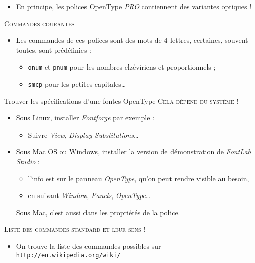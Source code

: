 \documentclass[12pt,a4paper,twocolumn]{book} %
\def\ogla{{\fontfamily{fi4}\selectfont<<}}
\def\fgla{{\fontfamily{fi4}\selectfont>>}}
\begin{document}
{\begin{itemize}
	
			
				
				Regardez attentivement petites capitales penchées et les \ogla s \fgla !
				
				Il faut, bien sûr, que la fonte considérée le permette !
				\item<+->  En principe, les polices OpenType \textit{PRO} contiennent des variantes optiques !
\end{itemize}
{\textsc{Commandes courantes}}
			
			\begin{itemize}
				\item<+-> Les commandes de ces polices sont des mots de 4 lettres, certaines, souvent toutes, sont prédéfinies :
				\begin{itemize}
					\item<+-> \texttt{onum} et \texttt{pnum} pour les nombres elzéviriens et proportionnels ;
					\item<+-> \texttt{smcp} pour les petites capitales\dots
				\end{itemize}
			\end{itemize}		
		
		
	{Trouver les spécifications d'une fontes OpenType}	
{\textsc{Cela dépend du système !}}
  \begin{itemize}
  \item Sous Linux, installer \textit{Fontforge} par exemple :
			\begin{itemize}
				\item<+-> Suivre \textit{View}, \textit{Display Substitutions}\dots
			\end{itemize}
	\item Sous Mac OS ou Windows, installer la version de démonstration de \textit{FontLab Studio} :
			\begin{itemize}
				\item<+-> l'info est sur le panneau \textit{OpenType}, qu'on peut rendre visible au besoin,
				\item<+-> en suivant \textit{Window}, \textit{Panels}, \textit{OpenType}\dots
			\end{itemize}
			Sous Mac, c'est aussi dans les propriétés de la police.
	\end{itemize}		
		
		
		{\textsc{Liste des commandes standard et leur sens !}}
			
			\begin{itemize}
				\item<+-> On trouve la liste des commandes possibles sur \verb=http://en.wikipedia.org/wiki/=
				

\end{itemize}}
\end{document}

